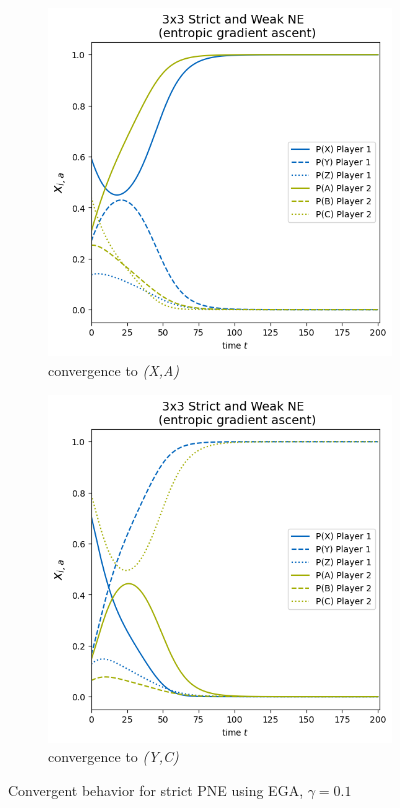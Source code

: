 \begin{figure}[H]
\captionsetup{justification=centering}
\centering
\begin{subfigure}{.5\textwidth}
    \centering
    \includegraphics[width=\textwidth]{logos/Weak3x3a.png}
    \caption{convergence to \textit{(X,A)}}
    \label{fig:Weak3x3a}
\end{subfigure}%
\begin{subfigure}{.5\textwidth}
    \centering
    \includegraphics[width=\textwidth]{logos/Weak3x3b.png}
    \caption{convergence to \textit{(Y,C)}}
    \label{fig:Weak3x3b}
\end{subfigure}
\caption{Convergent behavior for strict PNE using EGA, $\gamma = 0.1$}
\label{fig:Weak3x3}
\end{figure}

